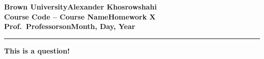 \documentclass[11pt]{exam}
\newcommand{\myname}{Alexander Khosrowshahi}
\newcommand{\assignment}{Homework X}
\newcommand{\duedate}{Month, Day, Year}
\begin{document}
\textbf{Brown University}\hfill\textbf{\myname}\\[0.01in]
\textbf{Course Code -- Course Name}\hfill\textbf{\assignment}\\[0.01in]
\textbf{Prof.\ Professorson}\hfill\textbf{\duedate}\\
\smallskip\hrule\bigskip

\begin{questions}

	\question \textbf{This is a question!}

\end{questions}
\end{document}
